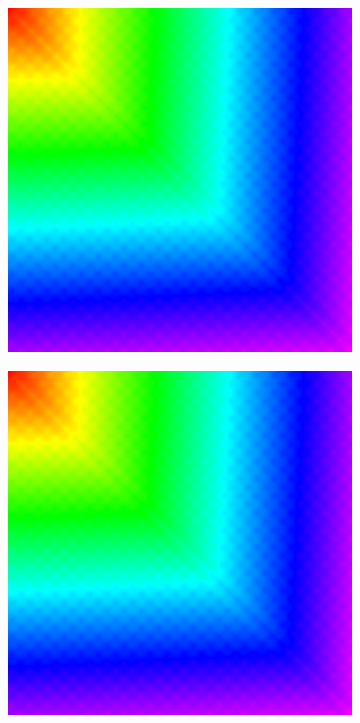 \documentclass[11pt]{article}       %
\begin{document}
\begin{figure}
	\begin{subfigure}[b]{.3\columnwidth}
		\includegraphics[width=\textwidth]{Figures/fmm_sin_checkerboard}
	\end{subfigure}
	\begin{subfigure}[b]{.3\columnwidth}
		\includegraphics[width=\textwidth]{Figures/fim_sin_checkerboard}

\end{subfigure}
\end{figure}
\end{document}
